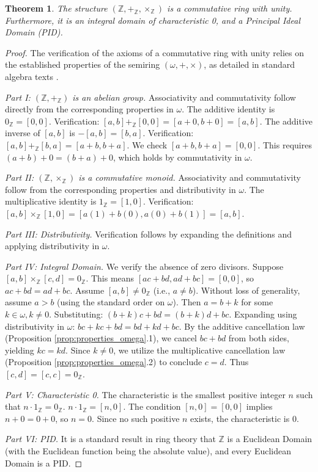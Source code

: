 \documentclass[11pt, a4paper]{article}
\theoremstyle{plain}
\newtheorem{theorem}{Theorem}[section]
\theoremstyle{definition}
\numberwithin{equation}{section}
\newcommand{\Z}{\mathbb{Z}}
\begin{document}
\begin{theorem}\label{thm:Z_is_ring}
The structure $(\Z, +_{\Z}, \times_{\Z})$ is a commutative ring with unity. Furthermore, it is an integral domain of characteristic 0, and a Principal Ideal Domain (PID).
\end{theorem}
\begin{proof}
The verification of the axioms of a commutative ring with unity relies on the established properties of the semiring $(\omega, +, \times)$, as detailed in standard algebra texts \cite{LangAlgebra}.

\textit{Part I: $(\Z, +_{\Z})$ is an abelian group.}
Associativity and commutativity follow directly from the corresponding properties in $\omega$.
The additive identity is $0_{\Z} = [0, 0]$. Verification: $[a, b]+_{\Z}[0, 0] = [a+0, b+0] = [a, b]$.
The additive inverse of $[a, b]$ is $-[a, b] = [b, a]$. Verification: $[a, b]+_{\Z}[b, a] = [a+b, b+a]$. We check $[a+b, b+a] = [0, 0]$. This requires $(a+b)+0 = (b+a)+0$, which holds by commutativity in $\omega$.

\textit{Part II: $(\Z, \times_{\Z})$ is a commutative monoid.}
Associativity and commutativity follow from the corresponding properties and distributivity in $\omega$.
The multiplicative identity is $1_{\Z} = [1, 0]$. Verification: $[a, b]\times_{\Z}[1, 0] = [a(1)+b(0), a(0)+b(1)] = [a, b]$.

\textit{Part III: Distributivity.} Verification follows by expanding the definitions and applying distributivity in $\omega$.

\textit{Part IV: Integral Domain.} We verify the absence of zero divisors. Suppose $[a, b]\times_{\Z}[c, d] = 0_{\Z}$. This means $[ac+bd, ad+bc] = [0, 0]$, so $ac+bd = ad+bc$.
Assume $[a, b] \neq 0_{\Z}$ (i.e., $a\neq b$). Without loss of generality, assume $a>b$ (using the standard order on $\omega$). Then $a=b+k$ for some $k \in \omega, k\neq 0$.
Substituting: $(b+k)c+bd = (b+k)d+bc$.
Expanding using distributivity in $\omega$: $bc+kc+bd = bd+kd+bc$.
By the additive cancellation law (Proposition \ref{prop:properties_omega}.1), we cancel $bc+bd$ from both sides, yielding $kc=kd$.
Since $k\neq 0$, we utilize the multiplicative cancellation law (Proposition \ref{prop:properties_omega}.2) to conclude $c=d$. Thus $[c, d]=[c, c]=0_{\Z}$.

\textit{Part V: Characteristic 0.} The characteristic is the smallest positive integer $n$ such that $n\cdot 1_{\Z} = 0_{\Z}$. $n\cdot 1_{\Z} = [n, 0]$. The condition $[n, 0]=[0, 0]$ implies $n+0=0+0$, so $n=0$. Since no such positive $n$ exists, the characteristic is 0.

\textit{Part VI: PID.} It is a standard result in ring theory that $\Z$ is a Euclidean Domain (with the Euclidean function being the absolute value), and every Euclidean Domain is a PID.
\end{proof}
\end{document}
